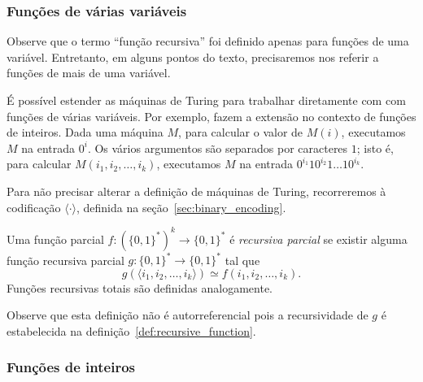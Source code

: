 
\subsubsection{Funções de várias variáveis}

Observe que o termo ``função recursiva''
foi definido apenas para funções de uma variável.
Entretanto,
em alguns pontos do texto,
precisaremos nos referir a funções de mais de uma variável.

É possível estender as máquinas de Turing
para trabalhar diretamente com com funções de várias variáveis.
Por exemplo, 
fazem a extensão no contexto de funções de inteiros.
Dada uma máquina $M$,
para calcular o valor de $M(i)$,
executamos $M$ na entrada $0^i$.
Os vários argumentos são separados por caracteres $1$;
isto é, para calcular $M(i_1, i_2, \dots, i_k)$,
executamos $M$ na entrada $0^{i_1} 1 0^{i_2} 1 \dots 1 0^{i_k}$.

Para não precisar alterar a definição de máquinas de Turing,
recorreremos à codificação $\langle \cdot \rangle$,
definida na seção~\ref{sec:binary_encoding}.

\begin{definition}
    \label{def:multi_valued_recursive_function}
    Uma função parcial $f: (\{0, 1\}^*)^k \to \{0, 1\}^*$ é \emph{recursiva parcial}
    se existir alguma função recursiva parcial $g: \{0, 1\}^* \to \{0, 1\}^*$
    tal que
    \begin{equation*}
        g(\langle i_1, i_2, \dots, i_k \rangle) \simeq f(i_1, i_2, \dots, i_k).
    \end{equation*}
    Funções recursivas totais são definidas analogamente.
\end{definition}

Observe que esta definição não é autorreferencial
pois a recursividade de $g$ é estabelecida na definição~\ref{def:recursive_function}.

\subsubsection{Funções de inteiros}

